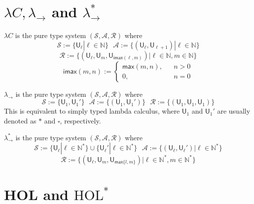 \section{$\lambda C, \lambda_\to$ and $\lambda_\to^*$}\label{applll}

  \begin{definition} $\lambda C$ is the pure type system $(\mathcal{S}, \mathcal{A}, \mathcal{R})$ where
    $$\mathcal{S} := \{\mathsf{U}_\ell | \ell \in \mathbb{N}\} \ \ \ \mathcal{A} := \{(\mathsf{U}_\ell, \mathsf{U}_{\ell + 1}) | \ell \in \mathbb{N}\}$$
    $$\mathcal{R} := \{(\mathsf{U}_\ell, \mathsf{U}_m, \mathsf{U}_{\mathsf{imax}(\ell, m)}) | \ell \in \mathbb{N}, m \in \mathbb{N}\}$$
    $$\mathsf{imax}(m, n) := \left\{\begin{aligned}
      \mathsf{max}(m, n), & & n > 0 \\
      0, & & n = 0
    \end{aligned}\right.$$
  \end{definition}
  
  \begin{definition} $\lambda_\to$ is the pure type system $(\mathcal{S}, \mathcal{A}, \mathcal{R})$ where
    $$\mathcal{S} := \{\mathsf{U}_1, \mathsf{U}_1'\} \ \ \ \mathcal{A} := \{(\mathsf{U}_1, \mathsf{U}_1')\} \ \ \ 
      \mathcal{R} := \{(\mathsf{U}_1, \mathsf{U}_1, \mathsf{U}_1)\}$$
    This is equivalent to simply typed lambda calculus, where $\mathsf{U}_1$ and $\mathsf{U}_1'$ are
    usually denoted as $*$ and $\square$, respectively.
  \end{definition}

  \begin{definition} $\lambda_\to^*$ is the pure type system $(\mathcal{S}, \mathcal{A}, \mathcal{R})$ where
    $$\mathcal{S} := \{\mathsf{U}_\ell | \ell \in \mathbb{N}^*\} \cup \{\mathsf{U}_\ell' | \ell \in \mathbb{N}^*\} \ \ \
      \mathcal{A} := \{(\mathsf{U}_\ell, \mathsf{U}_\ell') | \ell \in \mathbb{N}^*\}$$
    $$\mathcal{R} := \{(\mathsf{U}_\ell, \mathsf{U}_m, \mathsf{U}_{\mathsf{max} \{l, m\}}) | \ell \in \mathbb{N}^*, m \in \mathbb{N}^*\}$$
  \end{definition}

\section{HOL and $\text{HOL}^*$}\label{apphol}

